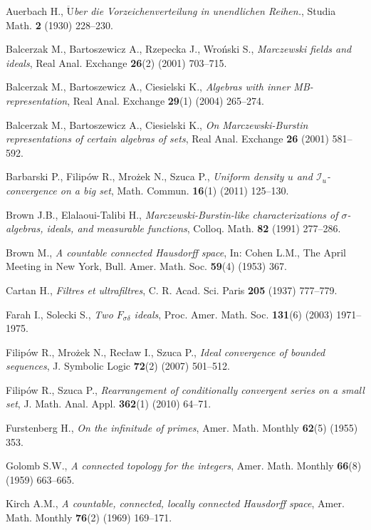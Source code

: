 \documentclass{amsart}
\theoremstyle{definition}
\theoremstyle{definition}
\newcommand{\I}{\mathcal I}
\begin{document}
\begin{thebibliography}{abc}

Auerbach H., \emph{$\ddot{\textrm{U}}$ber die Vorzeichenverteilung in unendlichen Reihen.},
Studia Math. {\bf 2} (1930) 228--230.

Balcerzak M., Bartoszewicz A., Rzepecka J., Wroński S., \emph{Marczewski fields and ideals},
Real Anal. Exchange {\bf 26}(2) (2001) 703--715.

Balcerzak M., Bartoszewicz A., Ciesielski K., \emph{Algebras with inner MB-representation},
Real Anal. Exchange {\bf 29}(1) (2004) 265--274.

Balcerzak M., Bartoszewicz A., Ciesielski K., \emph{On Marczewski-Burstin representations of certain algebras of sets},
Real Anal. Exchange {\bf 26} (2001) 581--592.

Barbarski P., Filipów R., Mrożek N., Szuca P., \emph{Uniform density $u$ and $\I_u$-convergence on a big set},
Math. Commun. {\bf 16}(1) (2011) 125--130.

Brown J.B., Elalaoui-Talibi H., \emph{Marczewski-Burstin-like characterizations of $\sigma$-algebras, ideals, and measurable functions},
Colloq. Math. {\bf 82} (1991) 277--286.

Brown M., \emph{A countable connected Hausdorff space},
In: Cohen L.M., The April Meeting in New York, Bull. Amer. Math. Soc. {\bf 59}(4) (1953) 367.

Cartan H., \emph{Filtres et ultrafiltres},
C. R. Acad. Sci. Paris {\bf 205} (1937) 777--779.

Farah I., Solecki S., \emph{Two $F_{\sigma\delta}$ ideals},
Proc. Amer. Math. Soc. {\bf 131}(6) (2003) 1971--1975.

Filipów R., Mrożek N., Recław I., Szuca P., \emph{Ideal convergence of bounded sequences},
J. Symbolic Logic {\bf 72}(2) (2007) 501--512.

Filipów R., Szuca P., \emph{Rearrangement of conditionally convergent series on a small set},
J. Math. Anal. Appl. {\bf 362}(1) (2010) 64--71.

Furstenberg H., \emph{On the infinitude of primes},
Amer. Math. Monthly {\bf 62}(5) (1955) 353.

Golomb S.W., \emph{A connected topology for the integers},
Amer. Math. Monthly {\bf 66}(8) (1959) 663--665.

Kirch A.M., \emph{A countable, connected, locally connected Hausdorff space},
Amer. Math. Monthly {\bf 76}(2) (1969) 169--171.


\end{thebibliography}
\end{document}
